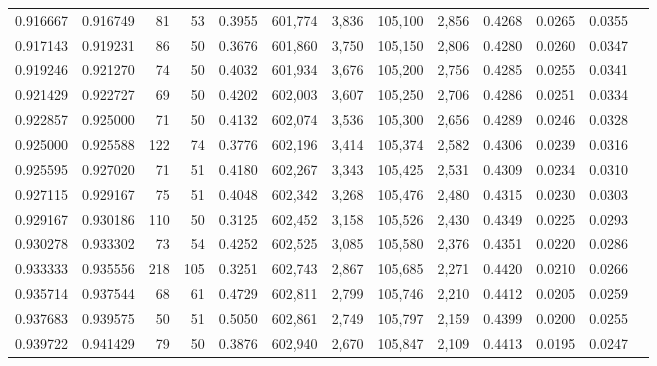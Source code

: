\begin{tabular}{rrrrrrrrrrrrr}
0.916667 & 0.916749 &     81 &    53 &                                     0.3955 & 601,774 &   3,836 & 105,100 &   2,856 & 0.4268 & 0.0265 & 0.0355 \\
0.917143 & 0.919231 &     86 &    50 &                                     0.3676 & 601,860 &   3,750 & 105,150 &   2,806 & 0.4280 & 0.0260 & 0.0347 \\
0.919246 & 0.921270 &     74 &    50 &                                     0.4032 & 601,934 &   3,676 & 105,200 &   2,756 & 0.4285 & 0.0255 & 0.0341 \\
0.921429 & 0.922727 &     69 &    50 &                                     0.4202 & 602,003 &   3,607 & 105,250 &   2,706 & 0.4286 & 0.0251 & 0.0334 \\
0.922857 & 0.925000 &     71 &    50 &                                     0.4132 & 602,074 &   3,536 & 105,300 &   2,656 & 0.4289 & 0.0246 & 0.0328 \\
0.925000 & 0.925588 &    122 &    74 &                                     0.3776 & 602,196 &   3,414 & 105,374 &   2,582 & 0.4306 & 0.0239 & 0.0316 \\
0.925595 & 0.927020 &     71 &    51 &                                     0.4180 & 602,267 &   3,343 & 105,425 &   2,531 & 0.4309 & 0.0234 & 0.0310 \\
0.927115 & 0.929167 &     75 &    51 &                                     0.4048 & 602,342 &   3,268 & 105,476 &   2,480 & 0.4315 & 0.0230 & 0.0303 \\
0.929167 & 0.930186 &    110 &    50 &                                     0.3125 & 602,452 &   3,158 & 105,526 &   2,430 & 0.4349 & 0.0225 & 0.0293 \\
0.930278 & 0.933302 &     73 &    54 &                                     0.4252 & 602,525 &   3,085 & 105,580 &   2,376 & 0.4351 & 0.0220 & 0.0286 \\
0.933333 & 0.935556 &    218 &   105 &                                     0.3251 & 602,743 &   2,867 & 105,685 &   2,271 & 0.4420 & 0.0210 & 0.0266 \\
0.935714 & 0.937544 &     68 &    61 &                                     0.4729 & 602,811 &   2,799 & 105,746 &   2,210 & 0.4412 & 0.0205 & 0.0259 \\
0.937683 & 0.939575 &     50 &    51 &                                     0.5050 & 602,861 &   2,749 & 105,797 &   2,159 & 0.4399 & 0.0200 & 0.0255 \\
0.939722 & 0.941429 &     79 &    50 &                                     0.3876 & 602,940 &   2,670 & 105,847 &   2,109 & 0.4413 & 0.0195 & 0.0247 \\

\end{tabular}
